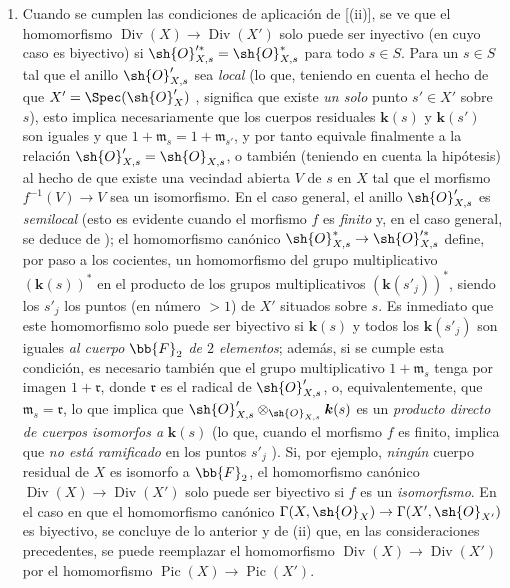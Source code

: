 \begin{remark}[21.8.6]
\begin{enumerate}[label=(\roman*)]
  \item Cuando se cumplen las condiciones de aplicación de [(ii)], se ve que el homomorfismo $\operatorname{Div}(X)\to\operatorname{Div}(X')$ solo puede ser inyectivo (en cuyo caso es biyectivo) si $\sh{O}'^{*}_{X,s}=\sh{O}^*_{X,s}$ para todo $s\in S$.
Para un $s\in S$ tal que el anillo $\sh{O}'_{X,s}$ sea \emph{local} (lo que, teniendo en cuenta el hecho de que $X'=\Spec(\sh{O}'_X)$ , significa que existe \emph{un solo} punto $s'\in X'$ sobre $s$), esto implica necesariamente que los cuerpos residuales $\boldsymbol{k}(s)$ y $\boldsymbol{k}(s')$ son iguales y que $1+\mathfrak{m}_s=1+\mathfrak{m}_{s'}$, y por tanto equivale finalmente a la relación $\sh{O}'_{X,s}=\sh{O}_{X,s}$, o también (teniendo en cuenta la hipótesis) al hecho de que existe una vecindad abierta $V$ de $s$ en $X$ tal que el morfismo $f^{-1}(V)\to V$ sea un isomorfismo.
En el caso general, el anillo $\sh{O}'_{X,s}$ es \emph{semilocal} (esto es evidente cuando el morfismo $f$ es \emph{finito} y, en el caso general, se deduce de ); el homomorfismo canónico $\sh{O}^{*}_{X,s}\to\sh{O}'^{*}_{X,s}$ define, por paso a los cocientes, un homomorfismo del grupo multiplicativo $(\boldsymbol{k}(s))^*$ en el producto de los grupos multiplicativos $(\boldsymbol{k}(s'_j))^*$, siendo los $s'_j$ los puntos (en
número $>1$) de $X'$ situados sobre $s$.
Es inmediato que este homomorfismo solo puede ser biyectivo si $\boldsymbol{k}(s)$ y todos los $\boldsymbol{k}(s'_j)$ son iguales \emph{al cuerpo} $\bb{F}_2$ \emph{de $2$ elementos};
además, si se cumple esta condición, es necesario también que el grupo multiplicativo $1+\mathfrak{m}_s$ tenga por imagen $1+\mathfrak{r}$, donde $\mathfrak{r}$ es el radical de $\sh{O}'_{X,s}$, o, equivalentemente, que $\mathfrak{m}_s=\mathfrak{r}$, lo que implica que $\sh{O}'_{X,s}\otimes_{\sh{O}_{X,s}}\boldsymbol{k}(s)$ es un \emph{producto directo de cuerpos isomorfos a} $\boldsymbol{k}(s)$ (lo que, cuando el morfismo $f$ es finito, implica que \emph{no está ramificado} en los puntos $s'_j$ ).
Si, por ejemplo, \emph{ningún} cuerpo residual de $X$ es isomorfo a $\bb{F}_2$, el homomorfismo canónico $\operatorname{Div}(X)\to\operatorname{Div}(X')$ solo puede ser biyectivo si $f$ es un \emph{isomorfismo}.
En el caso en que el homomorfismo canónico $\Gamma(X,\sh{O}_X)\to\Gamma(X',\sh{O}_{X'})$ es biyectivo, se concluye de lo anterior y de (ii) que, en las consideraciones precedentes, se puede reemplazar el homomorfismo $\operatorname{Div}(X)\to\operatorname{Div}(X')$ por el homomorfismo $\operatorname{Pic}(X)\to\operatorname{Pic}(X')$.
\end{enumerate}
\end{remark}
